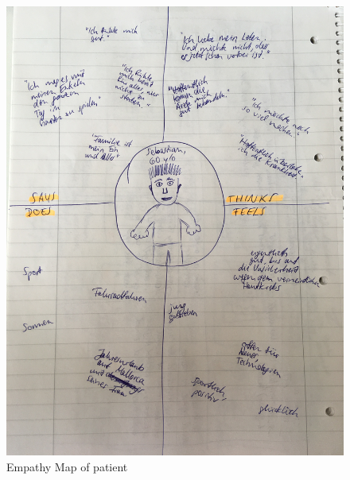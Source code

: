 \begin{figure}[h!]
	\centering
	\includegraphics[width=1\textwidth]{images/empathymap_patient.jpg}
	\caption{Empathy Map of patient}
	\label{verticallatter}
\end{figure}

